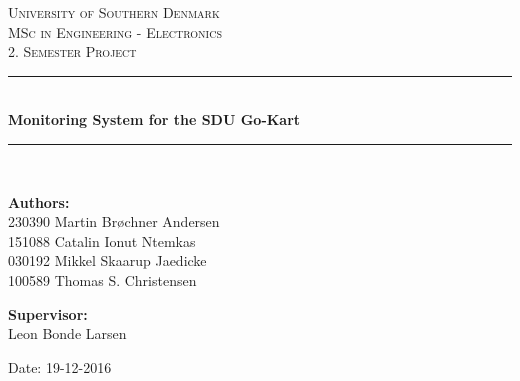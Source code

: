 \begin{titlepage}
\begin{center}

\textsc{\LARGE University of Southern Denmark}\\[1.5cm]
\textsc{\Large MSc in Engineering - Electronics}\\
\textsc{\large 2. Semester Project}\\[0.5cm]

\vfill
\vspace{3cm}
\hrule ~\\[0.3cm]
{ \LARGE \bfseries Monitoring System for the SDU Go-Kart\\[0.4cm] }
\hrule ~\\[1.5cm]

\vfill

\vspace{7cm}
\begin{minipage}[t]{.55\textwidth}
\begin{flushleft} \large
\textbf{Authors:}\\
230390 Martin Brøchner Andersen\\
151088 Catalin Ionut Ntemkas\\
030192 Mikkel Skaarup Jaedicke\\
100589 Thomas S. Christensen
\end{flushleft}
\end{minipage}
\begin{minipage}[t]{.44\textwidth}
\begin{flushright} \large
\textbf{Supervisor:} \\
Leon Bonde Larsen
\end{flushright}
\end{minipage}

\vspace{1cm}
Date: 19-12-2016

\vspace{1cm}

\end{center}
\restoregeometry
\end{titlepage}